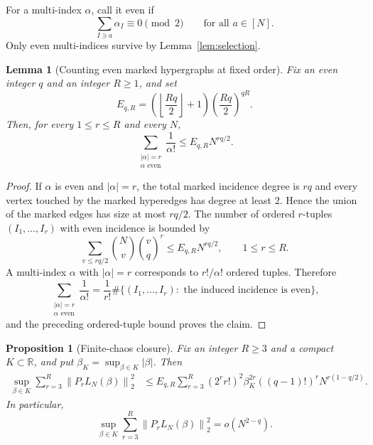 \documentclass[11pt]{article}
\newtheorem{lemma}[theorem]{Lemma}
\newtheorem{proposition}[theorem]{Proposition}
\newcommand{\R}{\mathbb{R}}
\newcommand{\norm}[1]{\left\lVert #1\right\rVert}
\begin{document}
For a multi-index $\alpha$, call it even if
\begin{equation}\label{eq:alpha-even-def}
  \sum_{I\ni a}\alpha_I\equiv0\pmod2
  \qquad\text{for all }a\in[N].
\end{equation}
Only even multi-indices survive by Lemma~\ref{lem:selection}.

\begin{lemma}[Counting even marked hypergraphs at fixed order]
  \label{lem:even-marked-count}
  Fix an even integer $q$ and an integer $R\geq1$, and set
  \begin{equation}\label{eq:even-count-constant}
    E_{q,R}
    =
    \left(\left\lfloor\frac{Rq}{2}\right\rfloor+1\right)
    \left(\frac{Rq}{2}\right)^{qR}.
  \end{equation}
  Then, for every $1\leq r\leq R$ and every $N$,
  \begin{equation}\label{eq:even-marked-count}
    \sum_{\substack{|\alpha|=r\\ \alpha\text{ even}}}\frac1{\alpha!}
    \leq
    E_{q,R}N^{rq/2}.
  \end{equation}
\end{lemma}

\begin{proof}
  If $\alpha$ is even and $|\alpha|=r$, the total marked incidence degree is
  $rq$ and every vertex touched by the marked hyperedges has degree at least
  $2$.  Hence the union of the marked edges has size at most $rq/2$.  The number
  of ordered $r$-tuples $(I_1,\ldots,I_r)$ with even incidence is bounded by
  \begin{equation}\label{eq:ordered-even-count}
    \sum_{v\leq rq/2}\binom{N}{v}\binom{v}{q}^r
    \leq E_{q,R}N^{rq/2},
    \qquad 1\leq r\leq R.
  \end{equation}
  A multi-index $\alpha$ with $|\alpha|=r$ corresponds to $r!/\alpha!$
  ordered tuples.  Therefore
  \begin{equation}\label{eq:multiindex-from-ordered-count}
    \sum_{\substack{|\alpha|=r\\ \alpha\text{ even}}}\frac1{\alpha!}
    =
    \frac1{r!}
    \#\{(I_1,\ldots,I_r):\text{ the induced incidence is even}\},
  \end{equation}
  and the preceding ordered-tuple bound proves the claim.
\end{proof}

\begin{proposition}[Finite-chaos closure]\label{prop:finite-chaos-closure}
  Fix an integer $R\geq3$ and a compact $K\subset\R$, and put
  $\beta_K=\sup_{\beta\in K}|\beta|$.  Then
  \begin{align}\label{eq:finite-chaos-explicit-bound}
    \sup_{\beta\in K}
    \sum_{r=3}^R\norm{P_rL_N(\beta)}_2^2
    &\leq
    E_{q,R}
    \sum_{r=3}^R
    (2^rr!)^2\beta_K^{2r}((q-1)!)^r
    N^{r(1-q/2)}.
  \end{align}
  In particular,
  \begin{equation}\label{eq:finite-chaos-closure}
    \sup_{\beta\in K}
    \sum_{r=3}^R\norm{P_rL_N(\beta)}_2^2
    =
    o(N^{2-q}).
  \end{equation}
\end{proposition}
\end{document}
